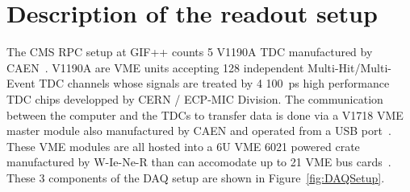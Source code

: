 \section{Description of the readout setup}
\label{app1:sec:setup}

    The CMS RPC setup at GIF++ counts 5 V1190A \acf{TDC} manufactured by CAEN~\cite{V1190AMUT}. V1190A are VME units accepting 128 independent Multi-Hit/Multi-Event TDC channels whose signals are treated by 4 \SI{100}{ps} high performance TDC chips developped by CERN / ECP-MIC Division. The communication between the computer and the TDCs to transfer data is done via a V1718 VME master module also manufactured by CAEN and operated from a USB port~\cite{V1718MUT}. These VME modules are all hosted into a 6U VME 6021 powered crate manufactured by W-Ie-Ne-R than can accomodate up to 21 VME bus cards~\cite{6U6000MUT}. These 3 components of the DAQ setup are shown in Figure~\ref{fig:DAQSetup}.\\
    
